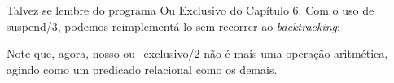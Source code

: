 \documentclass{article}
\begin{document}
Talvez se lembre do programa Ou Exclusivo do Capítulo 6. Com o uso de suspend/3, podemos reimplementá-lo sem recorrer ao \textit{backtracking}:
\vspace{3cm}



Note que, agora, nosso ou\_exclusivo/2 não é mais uma operação aritmética, agindo como um predicado relacional como os demais.


\end{document}
